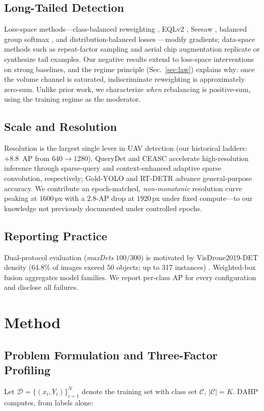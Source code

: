 \documentclass[journal]{IEEEtran}
\newcommand{\ap}{\textup{AP}}
\newcommand{\visdrone}{VisDrone2019-DET}
\begin{document}
\subsection{Long-Tailed Detection}
Loss-space methods---class-balanced reweighting \cite{cbloss}, EQLv2 \cite{eqlv2}, Seesaw \cite{seesaw}, balanced group softmax \cite{bge}, and distribution-balanced losses \cite{dbloss}---modify gradients; data-space methods such as repeat-factor sampling \cite{rfs} and aerial chip augmentation \cite{amrnet} replicate or synthesize tail examples. Our negative results extend to loss-space interventions on strong baselines, and the regime principle (Sec.~\ref{sec:law}) explains why: once the volume channel is saturated, indiscriminate reweighting is approximately zero-sum. Unlike prior work, we characterize \emph{when} rebalancing is positive-sum, using the training regime as the moderator.

\subsection{Scale and Resolution}
Resolution is the largest single lever in UAV detection (our historical ladders: $+8.8$~\ap{} from $640{\to}1280$). QueryDet \cite{querydet} and CEASC \cite{ceasc} accelerate high-resolution inference through sparse-query and context-enhanced adaptive sparse convolution, respectively; Gold-YOLO \cite{goldyolo} and RT-DETR \cite{rtdetr} advance general-purpose accuracy. We contribute an epoch-matched, \emph{non-monotonic} resolution curve peaking at $1600$\,px with a $2.8$-\ap{} drop at $1920$\,px under fixed compute---to our knowledge not previously documented under controlled epochs.

\subsection{Reporting Practice}
Dual-protocol evaluation (\emph{maxDets} $100/300$) is motivated by \visdrone{} density (64.8\% of images exceed 50 objects; up to 317 instances) \cite{visdrone}. Weighted-box fusion \cite{wbf} aggregates model families. We report per-class \ap{} for every configuration and disclose all failures.

\section{Method}
\label{sec:method}
\subsection{Problem Formulation and Three-Factor Profiling}
Let $\mathcal{D}=\{(x_i,Y_i)\}_{i=1}^{N}$ denote the training set with class set $\mathcal{C}$, $|\mathcal{C}|=K$. DAHP computes, from labels alone:
\end{document}
